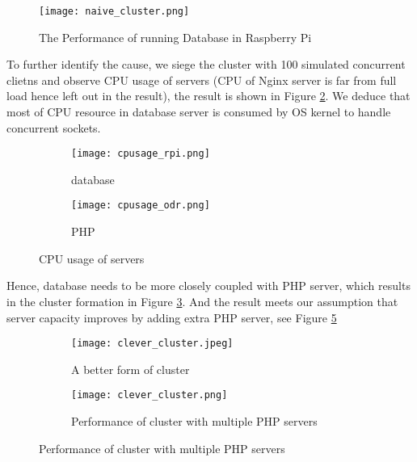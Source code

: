 \begin{figure}[htbp]
\centering
\texttt{[image: naive\_cluster.png]}
\caption{The Performance of running Database in Raspberry Pi}
\label{naive_cluster}
\end{figure}

To further identify the cause, we siege the cluster with 100 simulated concurrent clietns and observe CPU usage of servers (CPU of Nginx server is far from full load hence left out in the result), the result is shown in Figure \ref{cpu_usage}. We deduce that most of CPU resource in database server is consumed by OS kernel to handle concurrent sockets.
\begin{figure}[htbp]
\centering
\begin{subfigure}{0.45\textwidth}
\centering
\texttt{[image: cpusage\_rpi.png]}
\caption{database}
\end{subfigure}
\begin{subfigure}{0.45\textwidth}
\centering
\texttt{[image: cpusage\_odr.png]}
\caption{PHP}
\end{subfigure}
\caption{CPU usage of servers}
\label{cpu_usage}
\end{figure}

Hence, database needs to be more closely coupled with PHP server, which results in the cluster formation in Figure \ref{good_cluster}. And the result meets our assumption that server capacity improves by adding extra PHP server, see Figure \ref{good_cluster_perf}

\begin{figure}[h]
\centering
\begin{subfigure}{0.7\textwidth}
\centering
\texttt{[image: clever\_cluster.jpeg]}
\caption{A better form of cluster}
\label{good_cluster}
\end{subfigure}

\begin{subfigure}{0.45\textwidth}
\centering
\texttt{[image: clever\_cluster.png]}
\caption{Performance of cluster with multiple PHP servers}
\label{good_cluster_perf}
\end{subfigure}
\end{figure}



